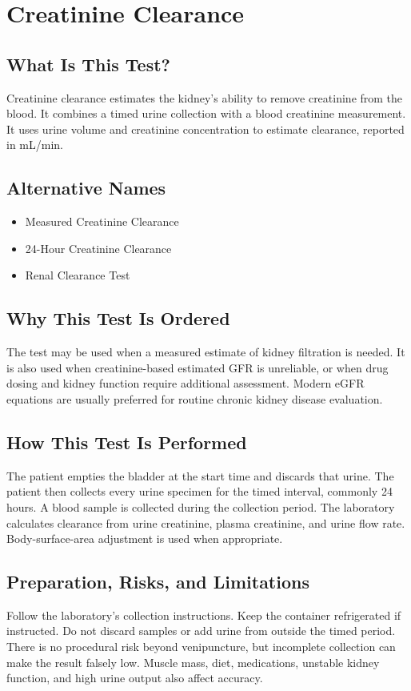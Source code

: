 \chapter{Creatinine Clearance}

\section*{What Is This Test?}
Creatinine clearance estimates the kidney's ability to remove creatinine from the blood. It combines a timed urine collection with a blood creatinine measurement. It uses urine volume and creatinine concentration to estimate clearance, reported in mL/min.

\section*{Alternative Names}
\begin{itemize}
  \item Measured Creatinine Clearance
  \item 24-Hour Creatinine Clearance
  \item Renal Clearance Test
\end{itemize}
\section*{Why This Test Is Ordered}
The test may be used when a measured estimate of kidney filtration is needed. It is also used when creatinine-based estimated GFR is unreliable, or when drug dosing and kidney function require additional assessment. Modern eGFR equations are usually preferred for routine chronic kidney disease evaluation.

\section*{How This Test Is Performed}
The patient empties the bladder at the start time and discards that urine. The patient then collects every urine specimen for the timed interval, commonly 24 hours. A blood sample is collected during the collection period. The laboratory calculates clearance from urine creatinine, plasma creatinine, and urine flow rate. Body-surface-area adjustment is used when appropriate.

\section*{Preparation, Risks, and Limitations}
Follow the laboratory's collection instructions. Keep the container refrigerated if instructed. Do not discard samples or add urine from outside the timed period. There is no procedural risk beyond venipuncture, but incomplete collection can make the result falsely low. Muscle mass, diet, medications, unstable kidney function, and high urine output also affect accuracy.

